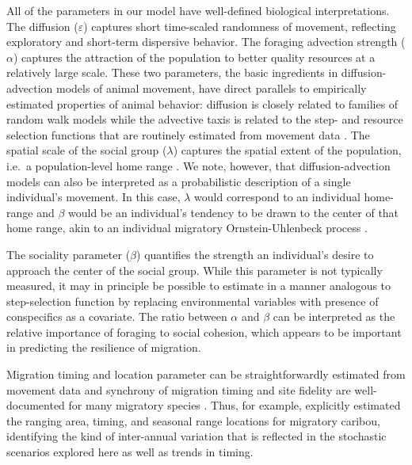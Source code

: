 \documentclass[utf8]{frontiersSCNS} %
\begin{document}
	All of the parameters in our model have well-defined biological interpretations. The diffusion ($\varepsilon$) captures short time-scaled randomness of movement, reflecting exploratory and short-term dispersive behavior. The foraging advection strength ($\alpha$) captures the attraction of the population to better quality resources at a relatively large scale. These two parameters, the basic ingredients in diffusion-advection models of animal movement, have direct parallels to empirically estimated properties of animal behavior: diffusion is closely related to families of random walk models \citep{Gurarie2011} while the advective taxis is related to the step- and resource selection functions that are routinely estimated from movement data \citep{Potts2020}. The spatial scale of the social group ($\lambda$) captures the spatial extent of the population, i.e.~a population-level home range \citep{Noonan2019}. 	We note, however, that diffusion-advection models can also be interpreted as a probabilistic description of a single individual's movement. In this case, $\lambda$ would correspond to an individual home-range and $\beta$ would be an individual's tendency to be drawn to the center of that home range, akin to an individual migratory Ornstein-Uhlenbeck process \citep{Gurarie2017}.
	
	The sociality parameter ($\beta$) quantifies the strength an individual's desire to approach the center of the social group. While this parameter is not typically measured, it may in principle be possible to estimate in a manner analogous to step-selection function by replacing environmental variables with presence of conspecifics as a covariate. The ratio between $\alpha$ and $\beta$ can be interpreted as the relative importance of foraging to social cohesion, which appears to be important in predicting the resilience of migration. 
			
	Migration timing and location parameter can be straightforwardly estimated from movement data \citep{Cagnacci2015, Gurarie2019} and synchrony of migration timing and site fidelity are well-documented for many migratory species \citep{Joly2021}. Thus, for example, \citet{Gurarie2019} explicitly estimated the ranging area, timing, and seasonal range locations for migratory caribou, identifying the kind of inter-annual variation that is reflected in the stochastic scenarios explored here as well as trends in timing. 
	
\end{document}
